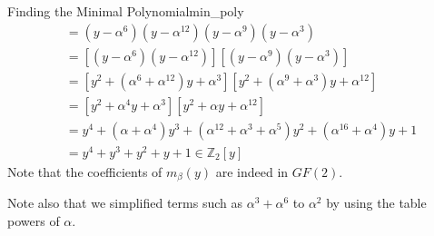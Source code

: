 \begin{Example}{Finding the Minimal Polynomial}{min_poly}
\begin{align*}
         & =(y-\alpha^{6})(y-\alpha^{12})(y-\alpha^{9})(y-\alpha^3)                                 \\
         & =[(y-\alpha^{6})(y-\alpha^{12})][(y-\alpha^{9})(y-\alpha^3)]                             \\
         & =[y^2+(\alpha^6+\alpha^{12})y+\alpha^3][y^2+(\alpha^9+\alpha^3)y+\alpha^{12}]            \\
         & =[y^2+\alpha^4 y+\alpha^3][y^2+\alpha y+\alpha^{12}]                                     \\
         & =y^4+(\alpha+\alpha^4)y^3+(\alpha^{12}+\alpha^3+\alpha^5)y^2+(\alpha^{16}+\alpha^{4})y+1 \\
         & =y^4+y^3+y^2+y+1\in \mathbb{Z}_2[y]
    \end{align*}
    Note that the coefficients of $ m_\beta(y) $ are indeed in $ GF(2) $.

    Note also that we simplified terms such as $ \alpha^3+\alpha^6 $ to $ \alpha^2 $
    by using the table powers of $ \alpha $.
\end{Example}

